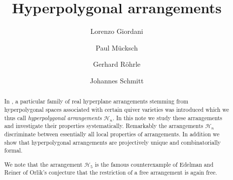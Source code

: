\documentclass[12pt]{amsart}
\newcommand\CH{{\mathscr H}}
\numberwithin{equation}{section}
\theoremstyle{plain}
\theoremstyle{definition}
\begin{document}
\title[Hyperpolygonal arrangements]
{Hyperpolygonal arrangements}

\author[L. Giordani]{Lorenzo Giordani}
\address
{Fakult\"at f\"ur Mathematik,
	Ruhr-Universit\"at Bochum,
	D-44780 Bochum, Germany}



\author[P.~M\"ucksch]{Paul M\"ucksch}
\address
{Technische Universität Berlin,
	Institut für Mathematik,
	Einsteinufer 19,
	D-10587 Berlin, Germany}


\author[G. R\"ohrle]{Gerhard R\"ohrle}
\address
{Fakult\"at f\"ur Mathematik,
Ruhr-Universit\"at Bochum,
D-44780 Bochum, Germany}

\author[J. Schmitt]{Johannes Schmitt}
\address
{Fakult\"at f\"ur Mathematik,
	Ruhr-Universit\"at Bochum,
	D-44780 Bochum, Germany}



\allowdisplaybreaks

\begin{abstract}
In \cite{bellamyetall:crepant},
a particular family of real hyperplane arrangements stemming from  
hyperpolygonal spaces associated with certain 
quiver varieties was introduced which we thus call 
\emph{hyperpolygonal arrangements} $\CH_n$.
In this note we study these
arrangements and 
investigate their properties systematically. 
Remarkably the arrangements 
$\CH_n$ discriminate between essentially all local properties of arrangements.
In addition we show that hyperpolygonal arrangements are projectively unique and combinatorially formal.

We note that the arrangement $\CH_5$
is the famous counterexample of Edelman and Reiner \cite{edelmanreiner:orlik} of Orlik's conjecture that the restriction of a free arrangement is again free. 
\end{abstract}

\maketitle

\end{document}
